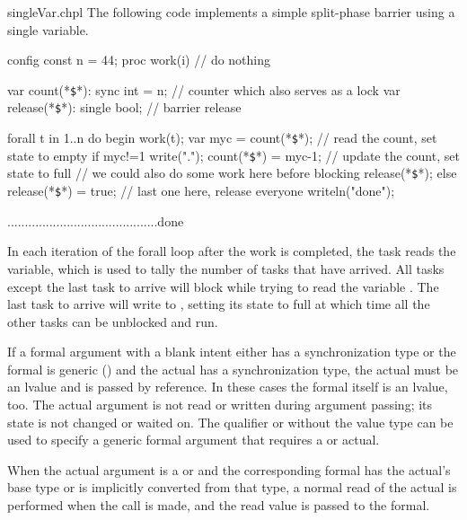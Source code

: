 \begin{chapelexample}{singleVar.chpl}
The following code implements a simple split-phase barrier using a
single variable.
\begin{chapelpre}
config const n = 44;
proc work(i) {
  // do nothing
}
\end{chapelpre}
\begin{chapel}
var count(*\texttt{\$}*): sync int = n;  // counter which also serves as a lock
var release(*\texttt{\$}*): single bool; // barrier release

forall t in 1..n do begin {
  work(t);
  var myc = count(*\texttt{\$}*);  // read the count, set state to empty
  if myc!=1 {
    write(".");
    count(*\texttt{\$}*) = myc-1;  // update the count, set state to full
    // we could also do some work here before blocking
    release(*\texttt{\$}*);
  } else {
    release(*\texttt{\$}*) = true;  // last one here, release everyone
    writeln("done");
  }
}
\end{chapel}
\begin{chapeloutput}
...........................................done
\end{chapeloutput}
In each iteration of the forall loop after the work is completed, the
task reads the  variable, which is
used to tally the number of tasks that have arrived.  All tasks except
the last task to arrive will block while trying to read the
variable .  The last task to arrive
will write to , setting its state to
full at which time all the other tasks can be unblocked and run.
\end{chapelexample}

If a formal argument with a blank intent either has a synchronization
type or the formal is generic ()
and the actual has a synchronization type, the actual must be an
lvalue and is passed by reference. In these cases the formal itself
is an lvalue, too. The actual argument is not read or written during
argument passing; its state is not changed or waited on. The qualifier
 or  without the value type can be used to
specify a generic formal argument that requires a 
or  actual.

When the actual argument is a  or  and the
corresponding formal has the actual's base type or is implicitly
converted from that type, a normal read of the actual is performed
when the call is made, and the read value is passed to the formal.


